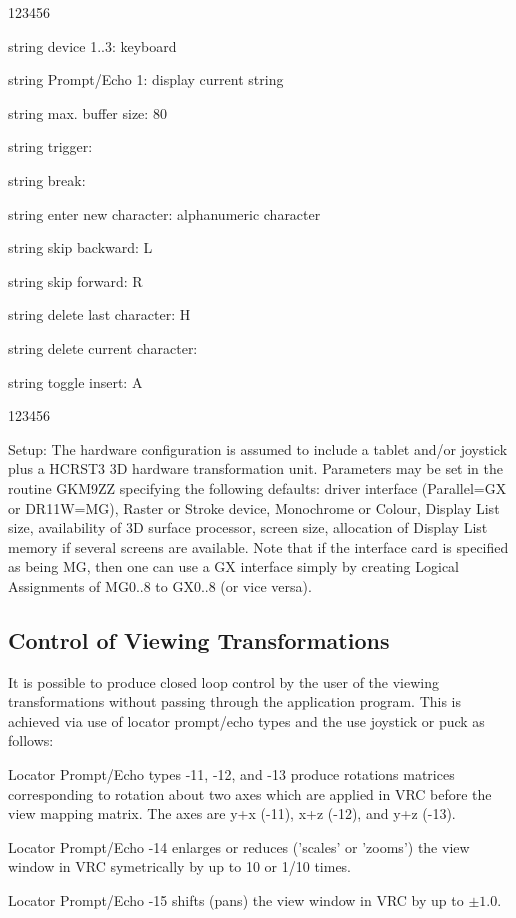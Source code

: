 \begin{DLtt}{123456}
\item[string device 1..3:]keyboard
\item[string Prompt/Echo 1:]display current string
\item[string max. buffer size:]80
\item[string trigger:]
\item[string break:]
\item[string enter new character:]alphanumeric character
\item[string skip backward:]L
\item[string skip forward:]R
\item[string delete last character:]H
\item[string delete current character:]
\item[string toggle insert:]A
\end{DLtt}
\begin{DLtt}{123456}
\item[Setup:]The hardware configuration is assumed to include a tablet and/or
joystick plus a HCRST3 3D hardware transformation unit.
Parameters may be set in the routine GKM9ZZ specifying the following
defaults: driver interface (Parallel=GX or DR11W=MG),
Raster or Stroke device, Monochrome or Colour, Display List size,
availability of 3D surface processor, screen size,
allocation of Display List memory if several screens are available.
Note that if the interface card is specified as being MG, then one
can use a GX interface simply by creating Logical Assignments
of MG0..8 to GX0..8 (or vice versa).
\end{DLtt}
\subsection{Control of Viewing Transformations}
 
It is possible to produce closed loop control by the user of the viewing
transformations without passing through the application program.
This is achieved via use of locator prompt/echo types and the use joystick
or puck as follows:
\begin{UL}
\item Locator Prompt/Echo types -11, -12, and -13 produce rotations matrices
corresponding to rotation about two axes which are applied in VRC before the
view mapping matrix. The axes are y+x (-11), x+z (-12), and y+z (-13).
\item Locator Prompt/Echo -14 enlarges or reduces ('scales' or 'zooms') the
view window in VRC symetrically by up to 10 or 1/10 times.
\item Locator Prompt/Echo -15 shifts (pans) the view window in VRC by up to
$\pm1.0$.
\end{UL}
 

